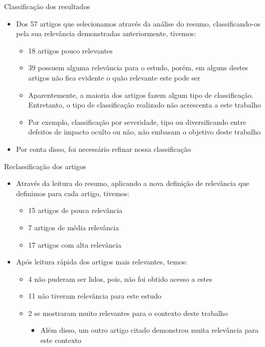 \documentclass[brazilian]{beamer}
\begin{document}
\begin{frame}{Classificação dos resultados}
    \begin{itemize}
        \item Dos 57 artigos que selecionamos através da análise do resumo, classificando-os pela sua relevância demonstradas anteriormente, tivemos:
            \begin{itemize}
                \item 18 artigos pouco relevantes
                \item 39 possuem alguma relevância para o estudo, porém, em alguns destes artigos não fica evidente o quão relevante este pode ser
                \item Aparentemente, a maioria dos artigos fazem algum tipo de classificação. Entretanto, o tipo de classificação realizado não acrescenta a este trabalho 
                \item Por exemplo, classificação por severidade, tipo ou diversificando entre defeitos de impacto oculto ou não, não embasam o objetivo deste trabalho
            \end{itemize}
        \item Por conta disso, foi necessário refinar nossa classificação
    \end{itemize}
\end{frame}

\begin{frame}{Reclassificação dos artigos}
    \begin{itemize}
        \item Através da leitura do resumo, aplicando a nova definição de relevância que definimos para cada artigo, tivemos:
        \begin{itemize}
            \item 15 artigos de pouca relevância
            \item 7 artigos de média relevância
            \item 17 artigos com alta relevância
        \end{itemize}
        \item Após leitura rápida dos artigos mais relevantes, temos:
        \begin{itemize}
            \item 4 não puderam ser lidos, pois, não foi obtido acesso a estes
            \item 11 não tiveram relevância para este estudo
            \item 2 se mostraram muito relevantes para o contexto deste trabalho
            \begin{itemize}
                \item Além disso, um outro artigo citado demonstrou muita relevância para este contexto
            \end{itemize}
        \end{itemize}
    \end{itemize}
\end{frame}
\end{document}
